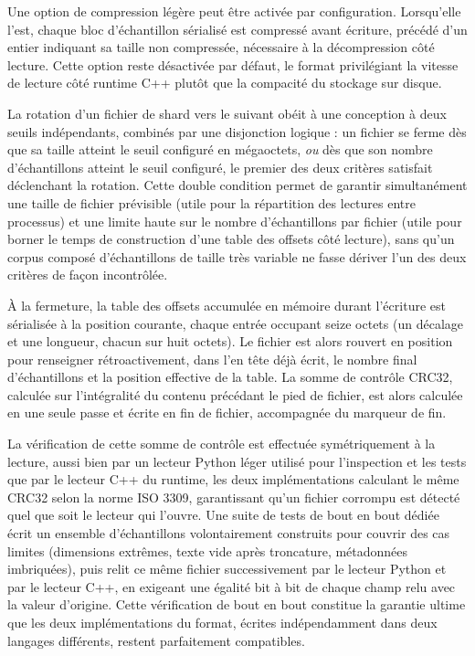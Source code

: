\documentclass[12pt,a4paper]{report}
\begin{document}
Une option de compression légère peut être activée par configuration. Lorsqu'elle l'est, chaque bloc d'échantillon sérialisé est compressé avant écriture, précédé d'un entier indiquant sa taille non compressée, nécessaire à la décompression côté lecture. Cette option reste désactivée par défaut, le format privilégiant la vitesse de lecture côté runtime C++ plutôt que la compacité du stockage sur disque.

La rotation d'un fichier de shard vers le suivant obéit à une conception à deux seuils indépendants, combinés par une disjonction logique : un fichier se ferme dès que sa taille atteint le seuil configuré en mégaoctets, \emph{ou} dès que son nombre d'échantillons atteint le seuil configuré, le premier des deux critères satisfait déclenchant la rotation. Cette double condition permet de garantir simultanément une taille de fichier prévisible (utile pour la répartition des lectures entre processus) et une limite haute sur le nombre d'échantillons par fichier (utile pour borner le temps de construction d'une table des offsets côté lecture), sans qu'un corpus composé d'échantillons de taille très variable ne fasse dériver l'un des deux critères de façon incontrôlée.

À la fermeture, la table des offsets accumulée en mémoire durant l'écriture est sérialisée à la position courante, chaque entrée occupant seize octets (un décalage et une longueur, chacun sur huit octets). Le fichier est alors rouvert en position pour renseigner rétroactivement, dans l'en tête déjà écrit, le nombre final d'échantillons et la position effective de la table. La somme de contrôle CRC32, calculée sur l'intégralité du contenu précédant le pied de fichier, est alors calculée en une seule passe et écrite en fin de fichier, accompagnée du marqueur de fin.

La vérification de cette somme de contrôle est effectuée symétriquement à la lecture, aussi bien par un lecteur Python léger utilisé pour l'inspection et les tests que par le lecteur C++ du runtime, les deux implémentations calculant le même CRC32 selon la norme ISO 3309, garantissant qu'un fichier corrompu est détecté quel que soit le lecteur qui l'ouvre. Une suite de tests de bout en bout dédiée écrit un ensemble d'échantillons volontairement construits pour couvrir des cas limites (dimensions extrêmes, texte vide après troncature, métadonnées imbriquées), puis relit ce même fichier successivement par le lecteur Python et par le lecteur C++, en exigeant une égalité bit à bit de chaque champ relu avec la valeur d'origine. Cette vérification de bout en bout constitue la garantie ultime que les deux implémentations du format, écrites indépendamment dans deux langages différents, restent parfaitement compatibles.
\end{document}
